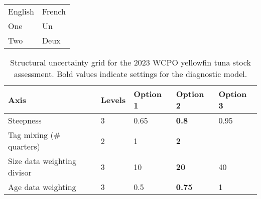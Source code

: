 \documentclass{article}
\begin{document}
\begin{table}
  \begin{tabular}{ll}
    English & French\\
    One     & Un    \\
    Two     & Deux  \\
  \end{tabular}
\end{table}

\begin{table}[t]
  \centering
  \caption{\label{tab:grid_desc} Structural uncertainty grid for the 2023 WCPO yellowfin tuna stock assessment. Bold values indicate settings for the diagnostic model.}
  \small
  \begin{tabular}{lllll}
    \hline
    Axis                        & Levels & Option 1 & Option 2      & Option 3\\
    \hline
    Steepness                   & 3      & 0.65     & \textbf{0.8}  & 0.95    \\
    Tag mixing (\# quarters)    & 2      & 1        & \textbf{2}    &         \\
    Size data weighting divisor & 3      & 10       & \textbf{20}   & 40      \\
    Age data weighting          & 3      & 0.5      & \textbf{0.75} & 1       \\
    \hline
  \end{tabular}
\end{table}
\end{document}
